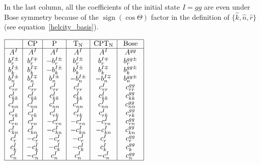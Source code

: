 \begin{refsection}
\begin{table}[htb]
{        In the last column, all the coefficients of the initial state $I = gg$ are even under Bose symmetry because of the $\operatorname{sign}(\cos \Theta)$ factor in the definition of $\{\hat{k},\hat{n},\hat{r}\}$ (see equation~\ref{helcity_basis}).
        }
\vspace*{6pt}
\begin{center}
\begin{math}
\begin{array}{|c|c|c|c|c|c|}
\hline
& \mathrm{CP} & \mathrm{P} & \mathrm{T}_{\mathrm{N}} & \mathrm{CPT}_{\mathrm{N}} & \text { Bose } \\
\hline 
A^I & A^I & A^I & A^I & A^I & A^{g g} \\
b_r^{I \pm} & b_r^{I \mp} & -b_r^{I \pm} & b_r^{I \pm} & b_r^{I \mp} & b_r^{g g \pm} \\
b_k^{I \pm} & b_k^{I \mp} & -b_k^{I \pm} & b_k^{I \pm} & b_k^{I \mp} & b_k^{g g \pm} \\
b_n^{I \pm} & b_n^{I \mp} & b_n^{I \pm} & -b_n^{I \pm} & -b_n^{I \mp} & b_n^{g g \pm} \\
c_{r r}^I & c_{r r}^I & c_{r r}^I & c_{r r}^I & c_{r r}^I & c_{r r}^{g g} \\
c_{k k}^I & c_{k k}^I & c_{k k}^I & c_{k k}^I & c_{k k}^I & c_{k k}^{g g} \\
c_{n n}^I & c_{n n}^I & c_{n n}^I & c_{n n}^I & c_{n n}^I & c_{n n}^{g g} \\
c_{r k}^I & c_{r k}^I & c_{r k}^I & c_{r k}^I & c_{r k}^I & c_{r k}^{g g} \\
c_{r n}^I & c_{r n}^I & -c_{r n}^I & -c_{r n}^I & -c_{r n}^I & c_{r n}^{g g} \\
c_{k n}^I & c_{k n}^I & -c_{k n}^I & -c_{k n}^I & -c_{k n}^I & c_{k n}^{g g} \\
c_r^I & -c_r^I & -c_r^I & -c_r^I & c_r^I & c_r^{g g} \\
c_k^I & -c_k^I & -c_k^I & -c_k^I & c_k^I & c_k^{g g} \\
c_n^I & -c_n^I & c_n^I & c_n^I & -c_n^I & c_n^{g g} \\
\hline
\end{array}
\end{math}
\label{coefficient_function_symmetries}
\end{center}
\end{table}


\end{refsection}
